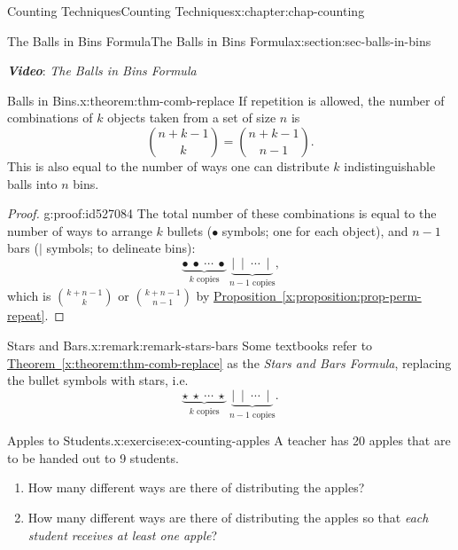 \documentclass[oneside,10pt,]{book}
\newcommand{\xreffont}{\relax}
\newcommand{\alert}[1]{\textbf{\textit{#1}}}
\numberwithin{equation}{section}
\begin{document}
\begin{chapterptx}{Counting Techniques}{}{Counting Techniques}{}{}{x:chapter:chap-counting}
\begin{sectionptx}{The Balls in Bins Formula}{}{The Balls in Bins Formula}{}{}{x:section:sec-balls-in-bins}
\begin{sidebyside}{1}{0}{0}{0}
\begin{sbspanel}{1}
\begin{tcbraster}[raster columns=2, raster column skip=1pt, raster halign=center, raster force size=false, raster left skip=0pt, raster right skip=0pt]
\end{tcbraster}%
\end{sbspanel}%
\end{sidebyside}%
\par
\alert{Video}: \emph{The Balls in Bins Formula}%
\begin{theorem}{Balls in Bins.}{}{x:theorem:thm-comb-replace}%
If repetition is allowed, the number of combinations of \(k\) objects taken from a set of size \(n\) is%
\begin{equation*}
\binom{n+k-1}{k} = \binom{n+k-1}{n-1}\text{.}
\end{equation*}
This is also equal to the number of ways one can distribute \(k\) indistinguishable balls into \(n\) bins.%
\end{theorem}
\begin{proof}{}{g:proof:id527084}
The total number of these combinations is equal to the number of ways to arrange \(k\) bullets (\(\bullet\) symbols; one for each object), and \(n-1\) bars (\(\mid\) symbols; to delineate bins):%
\begin{equation*}
\underbrace{\bullet \ \bullet \ \cdots \ \bullet}_{k \text{ copies}}\ \underbrace{\mid \ \mid \ \cdots \ \mid}_{n-1 \text{ copies}}\text{,}
\end{equation*}
which is \(\displaystyle\binom{k+n-1}{k}\) or \(\binom{k+n-1}{n-1}\) by \hyperref[x:proposition:prop-perm-repeat]{Proposition~{\xreffont\ref{x:proposition:prop-perm-repeat}}}.%
\end{proof}
\begin{remark}{Stars and Bars.}{x:remark:remark-stars-bars}%
Some textbooks refer to \hyperref[x:theorem:thm-comb-replace]{Theorem~{\xreffont\ref{x:theorem:thm-comb-replace}}} as the \emph{Stars and Bars Formula}, replacing the bullet symbols with stars, i.e.\@%
\begin{equation*}
\underbrace{\star \ \star \ \cdots \ \star}_{k \text{ copies}}\ \underbrace{\mid \ \mid \ \cdots \ \mid}_{n-1 \text{ copies}}\text{.}
\end{equation*}
%
\end{remark}
\begin{inlineexercise}{Apples to Students.}{x:exercise:ex-counting-apples}%
A teacher has 20 apples that are to be handed out to 9 students.%
\begin{enumerate}[label=(\alph*)]
\item{}How many different ways are there of distributing the apples?%
\item{}How many different ways are there of distributing the apples so that \emph{each student receives at least one apple}?%

\end{enumerate}
\end{inlineexercise}
\end{sectionptx}
\end{chapterptx}
\end{document}
